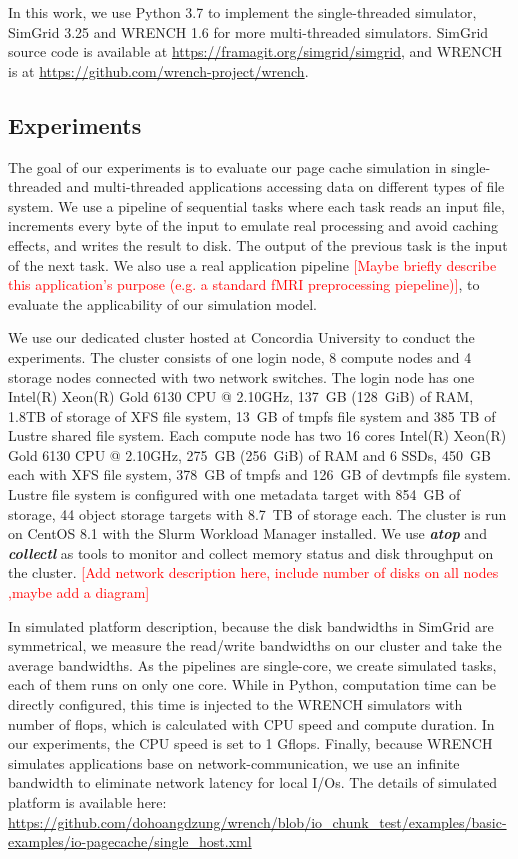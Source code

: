 \documentclass[conference]{IEEEtran}
\begin{document}
			In this work, we use Python 3.7 to implement the single-threaded simulator, 
			SimGrid 3.25 and WRENCH 1.6 for more multi-threaded simulators. 
			SimGrid source code is available at \url{https://framagit.org/simgrid/simgrid}, 
			and WRENCH is at \url{https://github.com/wrench-project/wrench}.
			
		\subsection{Experiments}
		
        	The goal of our experiments is to evaluate our page cache 
			simulation in single-threaded and multi-threaded applications
			accessing data on different types of file system. We use a pipeline
			of sequential tasks where each task reads an input file, increments
			every byte of the input to emulate real processing and avoid caching
			effects, and writes the result to disk. The output of the previous
			task is the input of the next task. We also use a real application 
            pipeline \textcolor{red}{[Maybe briefly describe this application's purpose (e.g. a standard fMRI preprocessing piepeline)]}, to evaluate the applicability of our simulation model. 
			
			We use our dedicated cluster hosted at Concordia University to conduct 
			the experiments. The cluster consists of one login node, 8 compute nodes 
			and 4 storage nodes connected with two network switches. The login node 
			has one Intel(R) Xeon(R) Gold 6130 CPU @ 2.10GHz, 137~GB (128~GiB) of RAM, 
			1.8TB of storage of XFS file system, 13~GB of tmpfs file system and 385 TB of 
			Lustre shared file system. Each compute node has two 16 cores Intel(R) 
			Xeon(R) Gold 6130 CPU @ 2.10GHz, 275~GB (256~GiB) of RAM and 6 SSDs, 
			450~GB each with XFS file system, 378~GB of tmpfs and 126~GB of devtmpfs file system.
			Lustre file system is configured with one metadata target with 854~GB 
			of storage, 44 object storage targets with 8.7~TB of storage each. 
			The cluster is run on CentOS 8.1 with the Slurm Workload Manager installed. 
			We use \textbf{\textit{atop}} and \textbf{\textit{collectl}} as tools to 
			monitor and collect memory status and disk throughput 
			on the cluster. 
			\textcolor{red}{[Add network description here, include number of disks 
			on all nodes ,maybe add a diagram]}
			
			In simulated platform description, because the disk bandwidths in SimGrid 
			are symmetrical, we measure the read/write bandwidths on our cluster and 
			take the average bandwidths. 
			As the pipelines are single-core, we create simulated tasks, 
			each of them runs on only one core. 
			While in Python, computation time can be directly configured, 
			this time is injected to the WRENCH simulators with number of flops, 
			which is calculated with CPU speed and compute duration. 
			In our experiments, the CPU speed is set to 1 Gflops. 
			Finally, because WRENCH simulates applications base on network-communication, 
			we use an infinite bandwidth to eliminate network latency for local I/Os.
			The details of simulated platform is available here: 
			\url{https://github.com/dohoangdzung/wrench/blob/io_chunk_test/examples/basic-examples/io-pagecache/single_host.xml}
			
\end{document}

